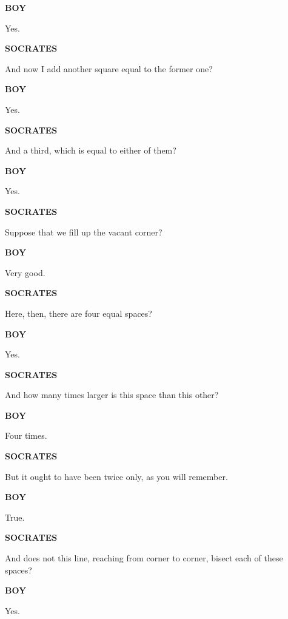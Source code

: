 \documentclass[11pt,letter]{article}
\begin{document}
\par \textbf{BOY}
\par   Yes.

\par \textbf{SOCRATES}
\par   And now I add another square equal to the former one?

\par \textbf{BOY}
\par   Yes.

\par \textbf{SOCRATES}
\par   And a third, which is equal to either of them?

\par \textbf{BOY}
\par   Yes.

\par \textbf{SOCRATES}
\par   Suppose that we fill up the vacant corner?

\par \textbf{BOY}
\par   Very good.

\par \textbf{SOCRATES}
\par   Here, then, there are four equal spaces?

\par \textbf{BOY}
\par   Yes.

\par \textbf{SOCRATES}
\par   And how many times larger is this space than this other?

\par \textbf{BOY}
\par   Four times.

\par \textbf{SOCRATES}
\par   But it ought to have been twice only, as you will remember.

\par \textbf{BOY}
\par   True.

\par \textbf{SOCRATES}
\par   And does not this line, reaching from corner to corner, bisect each of these spaces?

\par \textbf{BOY}
\par   Yes.
\end{document}
